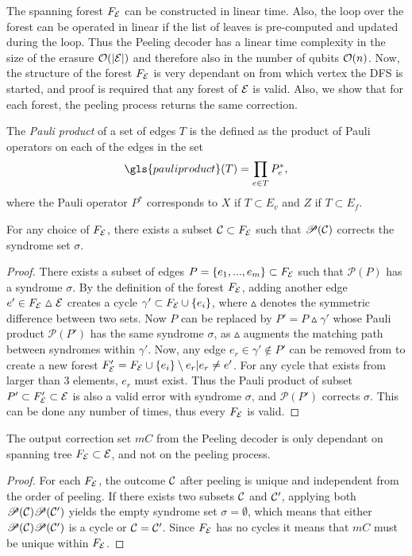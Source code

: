 The spanning forest $F_{\mathcal{E}}$ can be constructed in linear time. Also, the loop over the forest can be operated in linear if the list of leaves is pre-computed and updated during the loop. Thus the Peeling decoder has a linear time complexity in the size of the erasure $\mathcal{O}(\abs{\mathcal{E}})$ and therefore also in the number of qubits $\mathcal{O}(n)$. Now, the structure of the forest $F_{\mathcal{E}}$ is very dependant on from which vertex the DFS is started, and proof is required that any forest of $\mathcal{E}$ is valid. Also, we show that for each forest, the peeling process returns the same correction.
\begin{definition}
  The \emph{Pauli product} of a set of edges $T$ is the defined as the product of Pauli operators on each of the edges in the set
  \begin{equation}
    \gls{pauliproduct}(T) = \prod_{e\in T} P^*_e,
  \end{equation}
  where the Pauli operator $P^*$ corresponds to $X$ if $T\subset E_v$ and $Z$ if $T\subset E_f$. 
\end{definition}
\begin{lemma}\label{lem:anyforest}
  For any choice of $F_{\mathcal{E}}$, there exists a subset $\mathcal{C}\subset F_{\mathcal{E}}$ such that $\mathscr{P}(\mathcal{C})$ corrects the syndrome set $\sigma$.
\end{lemma}
\begin{proof}
  There exists a subset of edges $P = \{e_1,...,e_m\} \subset F_{\mathcal{E}}$ such that $\mathscr{P}(P)$ has a syndrome $\sigma$. By the definition of the forest $F_{\mathcal{E}}$, adding another edge $e' \in F_{\mathcal{E}} \vartriangle \mathcal{E}$ creates a cycle $\gamma' \subset F_{\mathcal{E}} \cup \{e_i\}$, where $\vartriangle$ denotes the symmetric difference between two sets. Now $P$ can be replaced by $P'=P\vartriangle\gamma'$ whose Pauli product $\mathscr{P}(P')$ has the same syndrome $\sigma$, as $\vartriangle$ augments the matching path between syndromes within $\gamma'$. Now, any edge $e_r\in \gamma' \notin P'$ can be removed from to create a new forest $F_{\mathcal{E}}'=F_{\mathcal{E}} \cup \{e_i\}\setminus e_r|e_r \neq e'$. For any cycle that exists from larger than 3 elements, $e_r$ must exist. Thus the Pauli product of subset $P' \subset F_{\mathcal{E}}'\subset \mathcal{E}$ is also a valid error with syndrome $\sigma$, and $\mathscr{P}(P')$ corrects $\sigma$. This can be done any number of times, thus every $F_{\mathcal{E}}$ is valid.   
\end{proof}
\begin{lemma}\label{lem:peelingfe}
  The output correction set $m{C}$ from the Peeling decoder is only dependant on spanning tree $F_{\mathcal{E}}\subset\mathcal{E}$, and not on the peeling process. 
\end{lemma}
\begin{proof}
   For each $F_{\mathcal{E}}$, the outcome $\mathcal{C}$ after peeling is unique and independent from the order of peeling. If there exists two subsets $\mathcal{C}$ and $\mathcal{C}'$, applying both $\mathscr{P}(\mathcal{C})\mathscr{P}(\mathcal{C}')$ yields the empty syndrome set $\sigma=\emptyset$, which means that either $\mathscr{P}(\mathcal{C})\mathscr{P}(\mathcal{C}')$ is a cycle or $\mathcal{C}=\mathcal{C}'$. Since $F_{\mathcal{E}}$ has no cycles it means that $m{C}$ must be unique within $F_{\mathcal{E}}$.
\end{proof}

